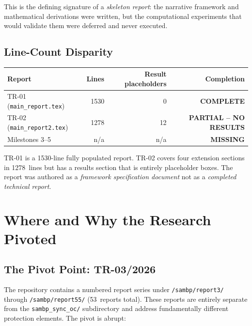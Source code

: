 \documentclass[12pt,a4paper]{article}
\newcommand{\statusComplete}{\textcolor{completedGreen}{\textbf{COMPLETE}}}
\newcommand{\statusPartial}{\textcolor{partialOrange}{\textbf{PARTIAL -- NO RESULTS}}}
\newcommand{\statusMissing}{\textcolor{missingRed}{\textbf{MISSING}}}
\begin{document}
This is the defining signature of a \emph{skeleton report}: the narrative
framework and mathematical derivations were written, but the computational
experiments that would validate them were deferred and never executed.

\subsection{Line-Count Disparity}
\label{sec:ev:linecount}

\begin{center}
\begin{tabular}{lrrr}
\toprule
\textbf{Report} & \textbf{Lines} & \textbf{Result placeholders} & \textbf{Completion} \\
\midrule
TR-01 (\texttt{main\_report.tex})  & 1530 & 0 & \statusComplete \\
TR-02 (\texttt{main\_report2.tex}) & 1278 & 12 & \statusPartial \\
Milestones 3--5                    & n/a  & n/a & \statusMissing \\
\bottomrule
\end{tabular}
\end{center}

TR-01 is a 1530-line fully populated report.  TR-02 covers four extension
sections in 1278~lines but has a results section that is entirely placeholder
boxes.  The report was authored as a \emph{framework specification document}
not as a \emph{completed technical report}.


\section{Where and Why the Research Pivoted}
\label{sec:pivot}

\subsection{The Pivot Point: TR-03/2026}
\label{sec:pivot:tr03}

The repository contains a numbered report series under \texttt{/sambp/report3/}
through \texttt{/sambp/report55/} (53~reports total).  These reports are entirely
separate from the \texttt{sambp\_sync\_oc/} subdirectory and address fundamentally
different protection elements.  The pivot is abrupt:
\end{document}
